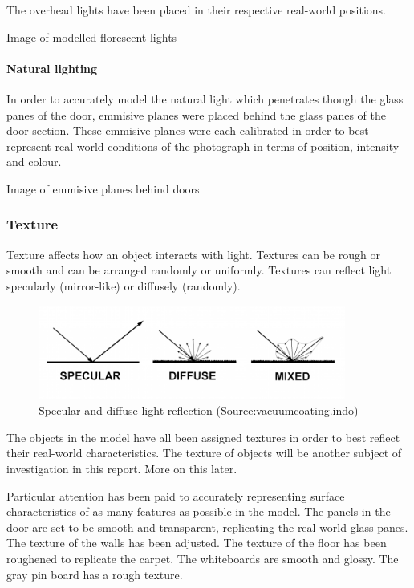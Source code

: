 \documentclass[11pt,a4paper]{report}
\begin{document}
					The overhead lights have been placed in their respective real-world positions. 
					
					{{Image of modelled florescent lights}}
				
				\paragraph{Natural lighting}
					In order to accurately model the natural light which penetrates though the glass panes of the door, emmisive planes were placed behind the glass panes of the door section. These emmisive planes were each calibrated in order to best represent real-world conditions of the photograph in terms of position, intensity and colour.
					
					{{Image of emmisive planes behind doors}}
			\subsubsection{Texture}
				Texture affects how an object interacts with light. Textures can be rough or smooth and can be arranged randomly or uniformly. Textures can reflect light specularly (mirror-like) or diffusely (randomly).
				
				
				\begin{figure}[H]
					\centering
					\includegraphics[width=0.9\textwidth]{light_reflection}
					\caption{Specular and diffuse light reflection (Source:vacuumcoating.indo)}
					\label{fig:light_reflection}
				\end{figure}
				The objects in the model have all been assigned textures in order to best reflect their real-world characteristics. The texture of objects will be another subject of investigation in this report. More on this later.
				
				Particular attention has been paid to accurately representing surface characteristics of as many features as possible in the model.
				The panels in the door are set to be smooth and transparent, replicating the real-world glass panes. 
				The texture of the walls has been adjusted.
				The texture of the floor has been roughened to replicate the carpet.
				The whiteboards are smooth and glossy.
				The gray pin board has a rough texture.
				
\end{document}
